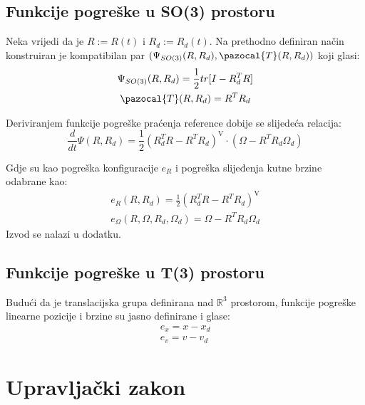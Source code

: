 \documentclass[times, utf8, diplomski, numeric]{fer}
\newcommand{\Ta}{\pazocal{T}}
\begin{document}
	\newpage
	\clearpage
	
	\subsection{Funkcije pogreške u SO(3) prostoru}
	Neka vrijedi da je $R := R(t)$ i $R_d := R_d(t)$. Na prethodno definiran način konstruiran je kompatibilan par $(\Psi_{SO(3)}(R, R_d), \Ta(R, R_d))$ koji glasi:
	\begin{gather}
		\Psi_{SO(3)}(R, R_d) = \frac{1}{2} tr[I - R_d^T R] \\
		\Ta(R, R_d) = R^T R_d
	\end{gather}
	
	Deriviranjem funkcije pogreške praćenja reference dobije se slijedeća relacija:
	\begin{equation}
		\frac{d}{dt} \Psi(R, R_d) = \frac{1}{2}(R_d^TR - R^TR_d)^{\text{V}} \cdot (\Omega - R^TR_d\Omega_d)
	\end{equation}
	
	Gdje su kao pogreška konfiguracije $e_R$ i pogreška slijeđenja kutne brzine odabrane kao: 
	\begin{gather}
		e_R(R, R_d) = \frac{1}{2}(R_d^TR - R^TR_d)^{\text{V}} \label{e_R}\\
		e_{\Omega}(R, \Omega, R_d, \Omega_d) = \Omega - R^TR_d\Omega_d \label{e_omega}
	\end{gather}
	Izvod se nalazi u dodatku.
	
	\subsection{Funkcije pogreške u T(3) prostoru}
	Budući da je translacijska grupa definirana nad $\mathbb{R}^3$ prostorom, funkcije pogreške linearne pozicije i brzine su jasno definirane i glase:
	\begin{gather}
		e_x = x - x_d \\
		e_v = v - v_d \label{e_v}
	\end{gather}
	
	\newpage
	\clearpage
	
\section{Upravljački zakon}
\end{document}
